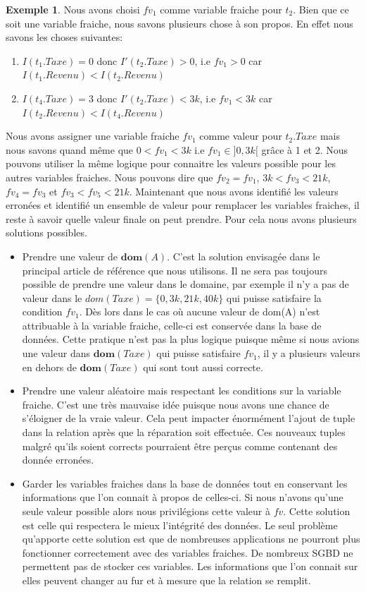\documentclass[letterpaper, 12pt]{report}
\theoremstyle{definition}
\newtheorem{myexample}{Exemple}
\newcommand{\dom}{\mathbf{dom}}
\begin{document}
\begin{myexample}
Nous avons choisi $fv_1$ comme variable fraiche pour $t_2$. Bien que ce soit une variable fraiche, nous savons plusieurs chose à son propos. En effet nous savons les choses suivantes:
\begin{enumerate}

\item $I(t_1.Taxe)=0$ donc $I'(t_2.Taxe)>0$, i.e $fv_1>0$ car $I(t_1.Revenu)<I(t_2.Revenu)$
\item $I(t_4.Taxe)=3$ donc $I'(t_2.Taxe)<3k$, i.e $fv_1<3k$ car $I(t_2.Revenu)<I(t_4.Revenu)$

\end{enumerate}

Nous avons assigner une variable fraiche $fv_1$ comme valeur pour $t_2.Taxe$ mais nous savons quand même que $0<fv_1<3k$ i.e $fv_1 \in ]0,3k[$ grâce à 1 et 2. Nous pouvons utiliser la même logique pour connaitre les valeurs possible pour les autres variables fraiches. Nous pouvons dire que $fv_2 = fv_1$, $3k<fv_3<21k$, $fv_4 = fv_3$ et $fv_3<fv_5<21k$. Maintenant que nous avons identifié les valeurs erronées et identifié un ensemble de valeur pour remplacer les variables fraiches, il reste à savoir quelle valeur finale on peut prendre. Pour cela nous avons plusieurs solutions possibles.\\
\end{myexample}
\begin{itemize}
	\item Prendre une valeur de $\dom(A)$. C'est la solution envisagée dans le principal article de référence que nous utilisons. Il ne sera pas toujours possible de prendre une valeur dans le domaine, par exemple il n'y a pas de valeur dans le $dom(Taxe)= \{0,3k,21k,40k\}$ qui puisse satisfaire la condition $fv_1$. Dès lors dans le cas où aucune valeur de dom(A) n'est attribuable à la variable fraiche, celle-ci est conservée dans la base de données. Cette pratique n'est pas la plus logique puisque même si nous avions une valeur dans $\dom(Taxe)$ qui puisse satisfaire $fv_1$, il y a plusieurs valeurs en dehors de $\dom(Taxe)$ qui sont tout aussi correcte.
	\item Prendre une valeur aléatoire mais respectant les conditions sur la variable fraiche. C'est une très mauvaise idée puisque nous avons une chance de s'éloigner de la vraie valeur. Cela peut impacter énormément l'ajout de tuple dans la relation après que la réparation soit effectuée. Ces nouveaux tuples malgré qu'ils soient corrects pourraient être perçus comme contenant des donnée erronées.
	\item Garder les variables fraiches dans la base de données tout en conservant les informations que l'on connait à propos de celles-ci. Si nous n'avons qu'une seule valeur possible alors nous privilégions cette valeur à $fv$. Cette solution est celle qui respectera le mieux l'intégrité des données. Le seul problème qu'apporte cette solution est que de nombreuses applications ne pourront plus fonctionner correctement avec des variables fraiches. De nombreux SGBD ne permettent pas de stocker ces variables. Les informations que l'on connait sur elles peuvent changer au fur et à mesure que la relation se remplit.
\end{itemize}
\end{document}
